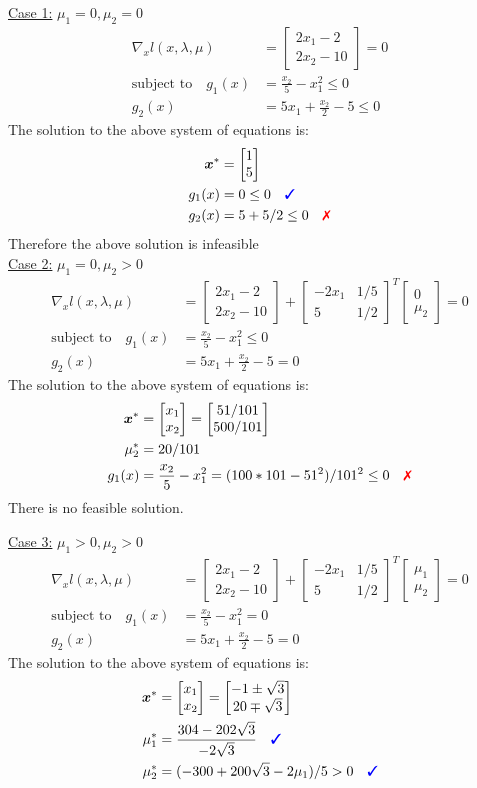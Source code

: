 \documentclass[a4paper,11pt]{article}
\newcommand{\V}[1]{\boldsymbol{#1}}
\newcommand{\mat}[1]{\begin{bmatrix}#1\end{bmatrix}}
\newcommand{\cmark}{{\color{blue}\text{\ding{51}}}}%
\newcommand{\xmark}{{\color{red}\text{\ding{55}}}}%
\begin{document}
\noindent\underline{Case 1:} $\mu_1=0, \mu_2=0$
\begin{align*}
 \nabla_x l(x,\lambda,\mu) &= \mat{2x_1 -2\\ 2x_2-10}=0\\
 \text{subject to}\quad g_1(x)&=\frac{x_2}{5}-x_1^2 \leq 0\\
 g_2(x)&=5x_1 +\frac{x_2}{2}-5\leq 0
\end{align*}
The solution to the above system of equations is:
\begin{align*}
 \V{x}^* &= \mat{1\\5}\\
 g_1(x)&= 0 \leq 0 \quad\cmark\\
 g_2(x)&= 5+5/2 \leq 0 \quad\xmark
\end{align*}
Therefore the above solution is infeasible\\

\noindent\underline{Case 2:} $\mu_1=0, \mu_2>0$
\begin{align*}
 \nabla_x l(x,\lambda,\mu) &= \mat{2x_1 -2\\ 2x_2-10} +\mat{-2x_1 & 1/5\\ 5& 1/2}^T\mat{0\\ \mu_2} =0\\
 \text{subject to}\quad g_1(x)&=\frac{x_2}{5}-x_1^2 \leq 0\\
 g_2(x)&=5x_1 +\frac{x_2}{2}-5= 0
\end{align*}
The solution to the above system of equations is:
\begin{align*}
 \V{x}^* &= \mat{x_1\\x_2} = \mat{51/101\\ 500/101}\\
 \mu_2^*& = 20/101\\
 g_1(x)&=\frac{x_2}{5}-x_1^2 = (100*101-51^2)/101^2 \leq 0 \quad \xmark\\
\end{align*}
There is no feasible solution.

\noindent\underline{Case 3:} $\mu_1>0, \mu_2>0$ 
\begin{align*}
 \nabla_x l(x,\lambda,\mu) &= \mat{2x_1 -2\\ 2x_2-10} +\mat{-2x_1 & 1/5\\ 5& 1/2}^T\mat{\mu_1\\ \mu_2} =0\\
 \text{subject to}\quad g_1(x)&=\frac{x_2}{5}-x_1^2 = 0\\
 g_2(x)&=5x_1 +\frac{x_2}{2}-5= 0
\end{align*}
The solution to the above system of equations is:
\begin{align*}
 \V{x}^* &= \mat{x_1\\x_2} = \mat{-1\pm\sqrt{3}\\ 20\mp\sqrt{3}}\\
 \mu_1^* &= \frac{304-202\sqrt{3}}{-2\sqrt{3}} \quad \cmark\\
 \mu_2^* &= (-300 + 200\sqrt{3} -2\mu_1)/5 >0 \quad\cmark
\end{align*}
\end{document}
